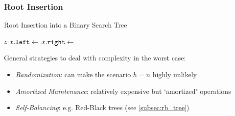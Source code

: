 \subsubsection{Root Insertion}
\label{subsubsec:bst_root_insert}
\begin{algorithm}[htb]
  \caption{Root Insertion into a Binary Search Tree}
  \label{alg:bst_root_insert}
  \begin{algorithmic}[1]
        \State \Return $z$
      \EndIf
        \State $x\mathtt{.}\mathtt{left}\gets$ 
        \State \Return {}
      \Else
        \State $x\mathtt{.}\mathtt{right}\gets$ 
        \State \Return {}
      \EndIf
    \EndFunction
  \end{algorithmic}
\end{algorithm}


General strategies to deal with complexity in the worst case:
\begin{itemize}%
  \item \emph{Randomization}: can make the scenario $h = n$ highly unlikely
  \item \emph{Amortized Maintenance}: relatively expensive but `amortized' operations
  \item \emph{Self-Balancing}: e.g. Red-Black trees (see \ref{subsec:rb_tree})
\end{itemize}



